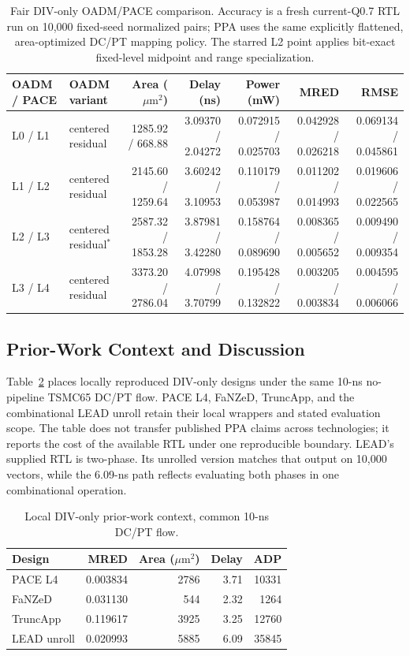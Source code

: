 \documentclass[conference]{IEEEtran}
\newcommand{\um}{\ensuremath{\mu\mathrm{m}^2}}
\begin{document}
\begin{table}[t]
\caption{Fair DIV-only OADM/PACE comparison. Accuracy is a fresh
current-Q0.7 RTL run on 10,000 fixed-seed normalized pairs; PPA uses the
same explicitly flattened, area-optimized DC/PT mapping policy. The starred
L2 point applies bit-exact fixed-level midpoint and range specialization.}
\label{tab:pace}
\centering\small
\begin{tabular}{llrrrrr}
\toprule
OADM / PACE & OADM variant & Area (\um) & Delay (ns) & Power (mW) & MRED & RMSE \\
\midrule
L0 / L1 & centered residual & 1285.92 / 668.88 & 3.09370 / 2.04272 & 0.072915 / 0.025703 & 0.042928 / 0.026218 & 0.069134 / 0.045861 \\
L1 / L2 & centered residual & 2145.60 / 1259.64 & 3.60242 / 3.10953 & 0.110179 / 0.053987 & 0.011202 / 0.014993 & 0.019606 / 0.022565 \\
L2 / L3 & centered residual$^\ast$ & 2587.32 / 1853.28 & 3.87981 / 3.42280 & 0.158764 / 0.089690 & 0.008365 / 0.005652 & 0.009490 / 0.009354 \\
L3 / L4 & centered residual & 3373.20 / 2786.04 & 4.07998 / 3.70799 & 0.195428 / 0.132822 & 0.003205 / 0.003834 & 0.004595 / 0.006066 \\
\bottomrule
\end{tabular}
\end{table}

\subsection{Prior-Work Context and Discussion}
Table~\ref{tab:prior} places locally reproduced DIV-only designs under the
same 10-ns no-pipeline TSMC65 DC/PT flow. PACE L4, FaNZeD, TruncApp, and the
combinational LEAD unroll retain their local wrappers and stated evaluation
scope. The table does not transfer published PPA claims across technologies;
it reports the cost of the available RTL under one reproducible boundary.
LEAD's supplied RTL is two-phase. Its unrolled version matches that output on
10,000 vectors, while the 6.09-ns path reflects evaluating both phases in one
combinational operation.

\begin{table}[t]
\caption{Local DIV-only prior-work context, common 10-ns DC/PT flow.}
\label{tab:prior}
\centering\scriptsize
\begin{tabular}{lrrrr}
\toprule
Design & MRED & Area (\um) & Delay & ADP \\
\midrule
PACE L4 & 0.003834 & 2786 & 3.71 & 10331 \\
FaNZeD & 0.031130 & 544 & 2.32 & 1264 \\
TruncApp & 0.119617 & 3925 & 3.25 & 12760 \\
LEAD unroll & 0.020993 & 5885 & 6.09 & 35845 \\
\bottomrule
\end{tabular}
\end{table}
\end{document}
